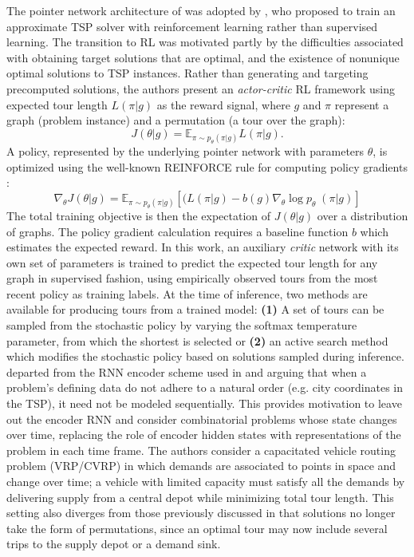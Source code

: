 The pointer network architecture of  was  adopted by , who proposed to train an approximate TSP solver with reinforcement learning rather than supervised learning. The transition to RL was motivated partly by the difficulties associated with obtaining target solutions that are optimal, and the existence of nonunique optimal solutions to TSP instances. Rather than generating and targeting precomputed solutions, the authors present an \emph{actor-critic} RL framework using expected tour length $L(\pi | g)$ as the reward signal, where $g$ and $\pi$ represent a graph (problem instance) and a permutation (a tour over the graph):
\begin{equation}
\label{eq:belloreward}
    J(\theta | g) = \mathbb{E}_{\pi \sim p_{\theta}(\pi|g)}L(\pi | g).
\end{equation}
A policy, represented by the underlying pointer network with parameters $\theta$, is optimized using the well-known REINFORCE rule for computing policy gradients :
\begin{equation}
\label{eq:bellograd}
    \nabla_{\theta} J(\theta | g) = \mathbb{E}_{\pi \sim p_{\theta}(\pi|g)} 
[ (L(\pi | g) - b(g) \nabla_{\theta} \log p_{\theta} \; (\pi | g)] 
\end{equation}
The total training objective is then the expectation of $J(\theta | g)$ over a distribution of graphs.
The policy gradient calculation requires a baseline function $b$ which estimates the expected reward. In this work, an auxiliary \emph{critic} network with its own set of parameters is trained to predict the expected tour length for any graph in supervised fashion, using empirically observed tours from the most recent policy as training labels. At the time of inference, two methods are available for producing tours from a trained model: {\bf (1)} A set of tours can be sampled from the stochastic policy by varying the softmax temperature parameter, from which the shortest is selected or {\bf (2)} an active search method which modifies the stochastic policy based on solutions sampled during inference.
 departed from the RNN encoder scheme used in  and  arguing that when a problem's defining data do not adhere to a natural order (e.g. city coordinates in the TSP), it need not be modeled sequentially. This provides motivation to leave out the encoder RNN and consider combinatorial problems whose state changes over time, replacing the role of encoder hidden states with representations of the problem in each time frame. The authors consider a capacitated vehicle routing problem (VRP/CVRP) in which demands are associated to points in space and change over time; a vehicle with limited capacity must satisfy all the demands by delivering supply from a central depot while minimizing total tour length. This setting also diverges from those previously discussed in that solutions no longer take the form of permutations, since an optimal tour may now include several trips to the supply depot or a demand sink. 
